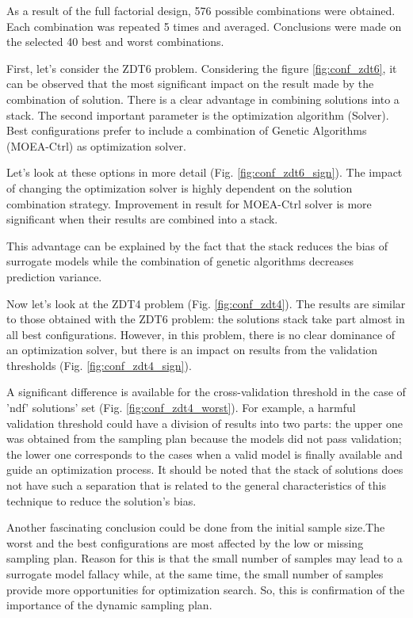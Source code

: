     As a result of the full factorial design, 576 possible combinations were obtained. Each combination was repeated 5 times and averaged. Conclusions were made on the selected 40 best and worst combinations.

    First, let's consider the ZDT6 problem. Considering the figure \ref{fig:conf_zdt6}, it can be observed that the most significant impact on the result made by the combination of solution. There is a clear advantage in combining solutions into a stack. The second important parameter is the optimization algorithm (Solver). Best configurations prefer to include a combination of Genetic Algorithms (MOEA-Ctrl) as optimization solver.

    Let's look at these options in more detail (Fig. \ref{fig:conf_zdt6_sign}). The impact of changing the optimization solver is highly dependent on the solution combination strategy. Improvement in result for MOEA-Ctrl solver is more significant when their results are combined into a stack.

    This advantage can be explained by the fact that the stack reduces the bias of surrogate models while the combination of genetic algorithms decreases prediction variance.

    Now let's look at the ZDT4 problem (Fig. \ref{fig:conf_zdt4}). The results are similar to those obtained with the ZDT6 problem: the solutions stack take part almost in all best configurations. However, in this problem, there is no clear dominance of an optimization solver, but there is an impact on results from the validation thresholds (Fig. \ref{fig:conf_zdt4_sign}). 

    A significant difference is available for the cross-validation threshold in the case of 'ndf' solutions' set (Fig. \ref{fig:conf_zdt4_worst}). For example, a harmful validation threshold could have a division of results into two parts: the upper one was obtained from the sampling plan because the models did not pass validation; the lower one corresponds to the cases when a valid model is finally available and guide an optimization process. It should be noted that the stack of solutions does not have such a separation that is related to the general characteristics of this technique to reduce the solution's bias.
    
    Another fascinating conclusion could be done from the initial sample size.The worst and the best configurations are most affected by the low or missing sampling plan. Reason for this is that the small number of samples may lead to a surrogate model fallacy while, at the same time, the small number of samples provide more opportunities for optimization search. So, this is confirmation of the importance of the dynamic sampling plan.

